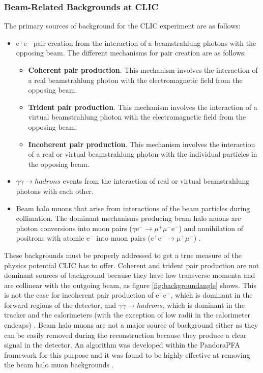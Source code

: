 
\subsubsection{Beam-Related Backgrounds at CLIC}
\label{sec:beamrelatedbackgrounds}
The primary sources of background for the CLIC experiment are as follows:
\begin{itemize}
\item $\text{e}^{+}\text{e}^{-}$ pair creation from the interaction of a beamstrahlung photons with the opposing beam.  The different mechanisms for pair creation are as follows:
\begin{itemize}
\item \textbf{Coherent pair production}.  This mechanism involves the interaction of a real beamstrahlung photon with the electromagnetic field from the opposing beam.
\item \textbf{Trident pair production}.  This mechanism involves the interaction of a virtual beamstrahlung photon with the electromagnetic field from the opposing beam.
\item \textbf{Incoherent pair production}.  This mechanism involves the interaction of a real or virtual beamstrahlung photon with the individual particles in the opposing beam.
\end{itemize}
\item $\gamma\gamma \rightarrow hadrons$ events from the interaction of real or virtual beamstrahlung photons with each other.  
\item Beam halo muons that arise from interactions of the beam particles during collimation.  The dominant mechanisms producing beam halo muons are photon conversions into muon pairs ($\gamma \text{e}^{-} \rightarrow \mu^{+}\mu^{-}\text{e}^{-}$) and annihilation of positrons with atomic $\text{e}^{-}$ into muon pairs ($\text{e}^{+}\text{e}^{-} \rightarrow \mu^{+}\mu^{-}$) \cite{Pilicer:2015ijy}.
\end{itemize}

These backgrounds must be properly addressed to get a true measure of the physics potential CLIC has to offer.  Coherent and trident pair production are not dominant sources of background because they have low transverse momenta and are collinear with the outgoing beam, as figure \ref{fig:backgroundangle} shows.  This is not the case for incoherent pair production of $\text{e}^{+}\text{e}^{-}$, which is dominant in the forward regions of the detector, and $\gamma\gamma \rightarrow hadrons$, which is dominant in the tracker and the calorimeters (with the exception of low radii in the calorimeter endcaps) \cite{Linssen:2012hp, Sailer:2012mfa}.  Beam halo muons are not a major source of background either as they can be easily removed during the reconstruction because they produce a clear signal in the detector.  An algorithm was developed within the PandoraPFA framework for this purpose and it was found to be highly effective at removing the beam halo muon backgrounds \cite{Linssen:2012hp}.  

